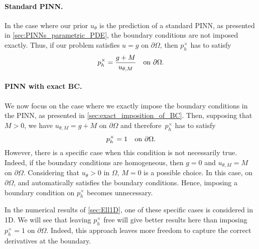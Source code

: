 \paragraph*{Standard PINN.}

In the case where our prior $u_\theta$ is the prediction of a standard PINN, as presented in \cref{sec:PINNs_parametric_PDE}, the boundary conditions are not imposed exactly. Thus, if our problem satisfies $u=g$ on $\partial \Omega$, then $p_h^\times$ has to satisfy
\[
    p_h^\times = \frac{g+M}{u_{\theta,M}} \text{\quad on } \partial \Omega.
\]

\paragraph*{PINN with exact BC.}

We now focus on the case where we exactly impose the boundary conditions in the PINN, as presented in \cref{sec:exact_imposition_of_BC}.
Then, supposing that $M>0$, we have $u_{\theta,M}=g+M$ on $\partial \Omega$ and therefore~$p_h^\times$ has to satisfy
\[
    p_h^\times = 1 \text{\quad on } \partial \Omega.
\]
However, there is a specific case when this condition is not necessarily true. Indeed, if the boundary conditions are homogeneous, then $g=0$ and $u_{\theta,M}=M$ on $\partial \Omega$.
Considering that $u_\theta>0$ in $\Omega$,
$M=0$ is a possible choice.
In this case,  on $\partial \Omega$,
and  automatically satisfies the boundary conditions.
Hence, imposing a boundary condition on $p_h^\times$ becomes unnecessary.

\begin{remark}
    In the numerical results of \cref{sec:Ell1D}, one of these specific
    cases is considered in 1D.
    We will see that leaving $p_h^\times$ free will give better results here than imposing $p_h^\times=1$ on $\partial \Omega$. Indeed, this approach leaves more freedom to capture the correct derivatives at the boundary.
\end{remark}




